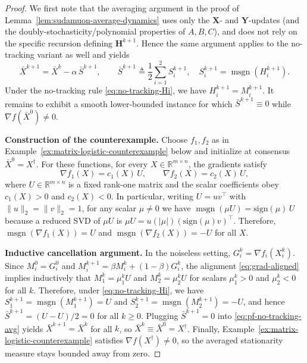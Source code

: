 \documentclass{article}
\begin{document}
\begin{proof}
We first note that the averaging argument in the proof of
Lemma~\ref{lem:sudamuon-average-dynamics} uses only the $\mathbf X$- and $\mathbf Y$-updates
(and the doubly-stochasticity/polynomial properties of $A,B,C$), and does not rely on
the specific recursion defining $\mathbf H^{k+1}$. Hence the same argument applies to
the no-tracking variant as well and yields
\begin{equation}
\label{eq:pf-no-tracking-avg}
\bar X^{k+1}=\bar X^k-\alpha\,\bar S^{k+1},
\qquad
\bar S^{k+1}\triangleq \frac{1}{2}\sum_{i=1}^2 S_i^{k+1},\quad
S_i^{k+1}=\operatorname{msgn}(H_i^{k+1}).
\end{equation}
Under the no-tracking rule \eqref{eq:no-tracking-Hi}, we have $H_i^{k+1}=M_i^{k+1}$.
It remains to exhibit a smooth lower-bounded instance for which
$\bar S^{k+1}\equiv 0$ while $\nabla f(\bar X^0)\neq 0$.

\medskip\noindent\textbf{Construction of the counterexample.}
Choose $f_1,f_2$ as in Example~\ref{ex:matrix-logistic-counterexample} below and
initialize at consensus $\bar X^0=X^\dagger$.
For these functions, for every $X\in\mathbb{R}^{m\times n}$, the gradients satisfy
\begin{equation}
\label{eq:grad-aligned}
\nabla f_1(X)=c_1(X)\,U,\qquad \nabla f_2(X)=c_2(X)\,U,
\end{equation}
where $U\in\mathbb{R}^{m\times n}$ is a fixed rank-one matrix and the scalar
coefficients obey $c_1(X)>0$ and $c_2(X)<0$.
In particular, writing $U=uv^\top$ with $\|u\|_2=\|v\|_2=1$, for any scalar $\mu\neq 0$ we have
$\operatorname{msgn}(\mu U)=\mathrm{sign}(\mu)\,U$ because a reduced SVD of $\mu U$ is
$\mu U=u(|\mu|)(\mathrm{sign}(\mu)v)^\top$.
Therefore, $\operatorname{msgn}(\nabla f_1(X))=U$ and $\operatorname{msgn}(\nabla f_2(X))=-U$ for all $X$.

\medskip\noindent\textbf{Inductive cancellation argument.}
In the noiseless setting, $G_i^k=\nabla f_i(X_i^k)$.
Since $M_i^0=G_i^0$ and $M_i^{k+1}=\beta M_i^k+(1-\beta)G_i^k$, the alignment
\eqref{eq:grad-aligned} implies inductively that $M_1^{k}=\mu_1^{k}U$ and
$M_2^{k}=\mu_2^{k}U$ for scalars $\mu_1^{k}>0$ and $\mu_2^{k}<0$ for all $k$.
Therefore, under \eqref{eq:no-tracking-Hi}, we have
$S_1^{k+1}=\operatorname{msgn}(M_1^{k+1})=U$ and
$S_2^{k+1}=\operatorname{msgn}(M_2^{k+1})=-U$, and hence
$\bar S^{k+1}=(U-U)/2=0$ for all $k\ge 0$.
Plugging $\bar S^{k+1}=0$ into \eqref{eq:pf-no-tracking-avg} yields
$\bar X^{k+1}=\bar X^k$ for all $k$, so $\bar X^k\equiv \bar X^0=X^\dagger$.
Finally, Example~\ref{ex:matrix-logistic-counterexample} satisfies
$\nabla f(X^\dagger)\neq 0$, so the averaged stationarity measure stays bounded away
from zero.
\end{proof}
\end{document}
